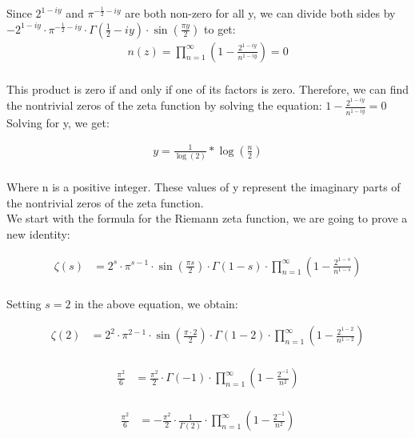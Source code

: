 \documentclass{article}
\begin{document}
Since $2^{1-iy}$ and $\pi^{-\frac{1}{2}-iy}$ are both non-zero for all y, we can divide both sides by  $-2^{1-iy}\cdot \pi^{-\frac{1}{2}-iy}\cdot \Gamma\left(\frac{1}{2}-iy\right) \cdot \sin\left(\frac{\pi y}{2}\right)$ to get: \\

\begin{align*}
n(z)=\prod_{n=1}^{\infty}\left(1-\frac{2^{1-iy}}{n^{1-iy}}\right) = 0 \\
\end{align*}

This product is zero if and only if one of its factors is zero. Therefore, we can find the nontrivial zeros of the zeta function by solving the equation: $1-\frac{2^{1-iy}}{n^{1-iy}} = 0$ Solving for y, we get:

\begin{align*}
y = \frac{1}{\log(2)} * \log\left(\frac{n}{2}\right) \\
\end{align*}

Where n is a positive integer. These values of y represent the imaginary parts of the nontrivial zeros of the zeta function. \\

We start with the formula for the Riemann zeta function, we are going to prove a new identity:

\begin{align*}
\zeta(s) &= 2^{s}\cdot\pi^{s-1}\cdot\sin(\frac{\pi s}{2})\cdot\Gamma(1-s)\cdot\prod_{n=1}^{\infty}(1-\frac{2^{1-s}}{n^{1-s}}) \\
\end{align*}

Setting $s=2$ in the above equation, we obtain:

\begin{align*}
\zeta(2) &= 2^{2}\cdot\pi^{2-1}\cdot\sin(\frac{\pi\cdot2}{2})\cdot\Gamma(1-2)\cdot\prod_{n=1}^{\infty}(1-\frac{2^{1-2}}{n^{1-2}}) \\
\end{align*}

\begin{align*}
\frac{\pi^2}{6} &= \frac{\pi^2}{2}\cdot\Gamma(-1)\cdot\prod_{n=1}^{\infty}(1-\frac{2^{-1}}{n^2}) \\
\end{align*}

\begin{align*}
\frac{\pi^2}{6} &= -\frac{\pi^2}{2}\cdot\frac{1}{\Gamma(2)}\cdot\prod_{n=1}^{\infty}(1-\frac{2^{-1}}{n^2}) \\
\end{align*}
\end{document}
